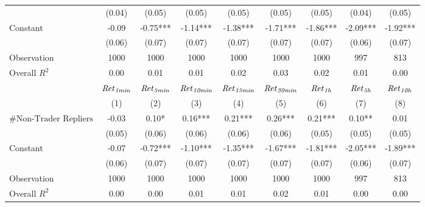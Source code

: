 \begin{tabular}{lcccccccc}
 & (0.04) & (0.05) & (0.05) & (0.05) & (0.05) & (0.05) & (0.04) & (0.05) \\
Constant & -0.09 & -0.75*** & -1.14*** & -1.38*** & -1.71*** & -1.86*** & -2.09*** & -1.92*** \\
 & (0.06) & (0.07) & (0.07) & (0.07) & (0.07) & (0.07) & (0.06) & (0.07) \\
Observation & 1000 & 1000 & 1000 & 1000 & 1000 & 1000 & 997 & 813 \\
Overall $R^2$ & 0.00 & 0.01 & 0.01 & 0.02 & 0.03 & 0.02 & 0.01 & 0.00 \\
\hline
 & ${\it Ret}_{\it 1min}$ & ${\it Ret}_{\it 5min}$ & ${\it Ret}_{\it 10min}$ & ${\it Ret}_{\it 15min}$ & ${\it Ret}_{\it 30min}$ & ${\it Ret}_{\it 1h}$ & ${\it Ret}_{\it 5h}$ & ${\it Ret}_{\it 10h}$ \\
 & (1) & (2) & (3) & (4) & (5) & (6) & (7) & (8) \\
\hline
$\#\text{Non-Trader Repliers}$ & -0.03 & 0.10* & 0.16*** & 0.21*** & 0.26*** & 0.21*** & 0.10** & 0.01 \\
 & (0.05) & (0.06) & (0.06) & (0.06) & (0.06) & (0.05) & (0.05) & (0.05) \\
Constant & -0.07 & -0.72*** & -1.10*** & -1.35*** & -1.67*** & -1.81*** & -2.05*** & -1.89*** \\
 & (0.06) & (0.07) & (0.07) & (0.07) & (0.07) & (0.07) & (0.06) & (0.07) \\
Observation & 1000 & 1000 & 1000 & 1000 & 1000 & 1000 & 997 & 813 \\
Overall $R^2$ & 0.00 & 0.00 & 0.01 & 0.01 & 0.02 & 0.01 & 0.00 & 0.00 \\
\hline
\end{tabular}
